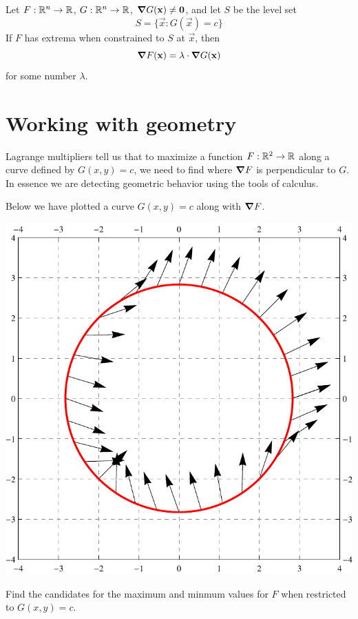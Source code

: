 \documentclass{ximera}
\begin{document}
\begin{theorem}
  Let $F:\mathbb R^n\to\mathbb R$, $G:\mathbb R^n\to\mathbb R$, $\boldsymbol\nabla G(\mathbf{x}) \ne \mathbf{0}$,
  and let $S$ be the level set
  \[
  S = \{\vec{x}: G(\vec{x}) = c\}
  \]
  If $F$ has extrema when constrained to $S$ at $\vec{x}$, then
  \[
  \boldsymbol\nabla F(\mathbf{x}) = \lambda \cdot \boldsymbol\nabla G(\mathbf{x})
  \]
  for some number $\lambda$.
\end{theorem}


  


\section{Working with geometry}

Lagrange multipliers tell us that to maximize a function $F:\mathbb R^2\to\mathbb R$
along a curve defined by $G(x,y) = c$, we need to find where $\boldsymbol\nabla F$
is perpendicular to $G$. In essence we are detecting geometric
behavior using the tools of calculus.

\begin{example}
  Below we have plotted a curve $G(x,y) = c$ along with $\boldsymbol\nabla F$.
  \begin{image}
    \includegraphics{curveVectors1.pdf}
  \end{image}
  Find the candidates for the maximum and minmum values for $F$ when
  restricted to $G(x,y) = c$.
  \begin{explanation}
  \end{explanation}
\end{example}
\end{document}

